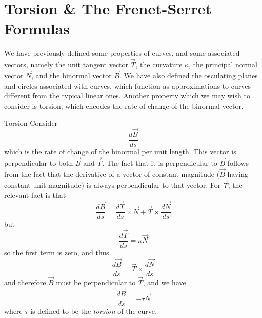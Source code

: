\documentclass[../main.tex]{subfiles}
\begin{document}
        \section{Torsion \& The Frenet-Serret Formulas}
                We have previously defined some properties of curves, and some associated vectors, namely the unit tangent vector \(\vec{T}\), the curvature \(\kappa\), the principal normal vector \(\vec{N}\), and the binormal vector \(\vec{B}\). We have also defined the osculating planes and circles associated with curves, which function as approximations to curves different from the typical linear ones. Another property which we may wish to consider is torsion, which encodes the rate of change of the binormal vector.
                \begin{definition}{Torsion}{}
                        Consider
                        \[
                        \frac{d\vec{B}}{ds}
                        \]
                        which is the rate of change of the binormal per unit length. This vector is perpendicular to both \(\vec{B}\) and \(\vec{T}\). The fact that it is perpendicular to \(\vec{B}\) follows from the fact that the derivative of a vector of constant magnitude (\(\vec{B}\) having constant unit magnitude) is always perpendicular to that vector. For \(\vec{T}\), the relevant fact is that
                        \[
                        \frac{d\vec{B}}{ds}=\frac{d\vec{T}}{ds}\times\vec{N}+\vec{T}\times\frac{d\vec{N}}{ds}
                        \]
                        but
                        \[
                        \frac{d\vec{T}}{ds}=\kappa\vec{N}
                        \]
                        so the first term is zero, and thus
                        \[
                        \frac{d\vec{B}}{ds}=\vec{T}\times\frac{d\vec{N}}{ds}
                        \]
                        and therefore \(\vec{B}\) must be perpendicular to \(\vec{T}\), and we have
                        \[
                        \frac{d\vec{B}}{ds}=-\tau\vec{N}
                        \]
                        where \(\tau\) is defined to be the \emph{torsion} of the curve.
                \end{definition}
\end{document}
